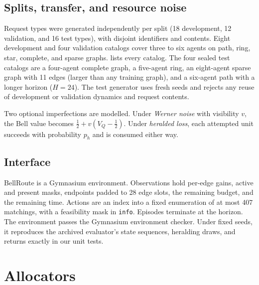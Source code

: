 \documentclass[10pt]{article}
\newcommand{\bellroute}{BellRoute}
\begin{document}
\subsection{Splits, transfer, and resource noise}\label{sec:splits}

Request types were generated independently per split (18 development, 12 validation, and 16 test types), with disjoint identifiers and contents. Eight development and four validation catalogs cover three to six agents on path, ring, star, complete, and sparse graphs.  lists every catalog. The four sealed test catalogs are a four-agent complete graph, a five-agent ring, an eight-agent sparse graph with 11 edges (larger than any training graph), and a six-agent path with a longer horizon ($H=24$). The test generator uses fresh seeds and rejects any reuse of development or validation dynamics and request contents.

\begin{table}[H]
\centering\small
\caption{All catalogs. ``Requests/state'' is the mean number of active requests per state. ``Stay'' and ``Next'' are the mean probabilities of staying in the same state and of moving to the next state in the generator's cycle. }
\label{tab:catalogs}

\end{table}
Two optional imperfections are modelled. Under \emph{Werner noise} with visibility $v$, the Bell value becomes $\tfrac12+v(V_Q-\tfrac12)$. Under \emph{heralded loss}, each attempted unit succeeds with probability $p_h$ and is consumed either way.

\subsection{Interface}\label{sec:gym}

\bellroute{} is a Gymnasium environment. Observations hold per-edge gains, active and present masks, endpoints padded to 28 edge slots, the remaining budget, and the remaining time. Actions are an index into a fixed enumeration of at most 407 matchings, with a feasibility mask in \texttt{info}. Episodes terminate at the horizon. The environment passes the Gymnasium environment checker. Under fixed seeds, it reproduces the archived evaluator's state sequences, heralding draws, and returns exactly in our unit tests.

\section{Allocators}\label{sec:methods}
\end{document}
